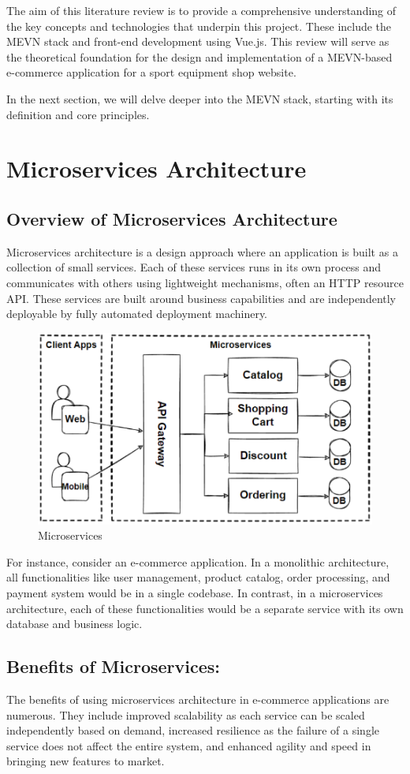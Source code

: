 The aim of this literature review is to provide a comprehensive understanding of the key concepts and technologies that underpin this project. These include the MEVN stack and front-end development using Vue.js. This review will serve as the theoretical foundation for the design and implementation of a MEVN-based e-commerce application for a sport equipment shop website.

In the next section, we will delve deeper into the MEVN stack, starting with its definition and core principles.
\section{Microservices Architecture}
\subsection{Overview of Microservices Architecture}
Microservices architecture is a design approach where an application is built as a collection of small services. Each of these services runs in its own process and communicates with others using lightweight mechanisms, often an HTTP resource API. These services are built around business capabilities and are independently deployable by fully automated deployment machinery.
\begin{figure}[H]
    \centering
    \includegraphics[width=.64\linewidth]{../images/micoservices_visualization.png}
    \caption{Microservices}\label{Fig:NN}
\end{figure}

For instance, consider an e-commerce application. In a monolithic architecture, all functionalities like user management, product catalog, order processing, and payment system would be in a single codebase. In contrast, in a microservices architecture, each of these functionalities would be a separate service with its own database and business logic.

\subsection{Benefits of Microservices:}
The benefits of using microservices architecture in e-commerce applications are numerous. They include improved scalability as each service can be scaled independently based on demand, increased resilience as the failure of a single service does not affect the entire system, and enhanced agility and speed in bringing new features to market.

